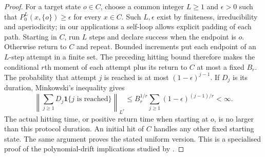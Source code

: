 \documentclass[12pt,a4paper]{article}
\theoremstyle{definition}
\theoremstyle{remark}\newtheorem{remark}{Remark}
\numberwithin{equation}{section}
\begin{document}
\begin{proof}
For a target state $o\in C$, choose a common integer $L\ge1$ and $\epsilon>0$ such that $P_0^L(x,\{o\})\ge\epsilon$ for every $x\in C$. Such $L,\epsilon$ exist by finiteness, irreducibility and aperiodicity; in our applications a self-loop allows explicit padding of each path. Starting in $C$, run $L$ steps and declare success when the endpoint is $o$. Otherwise return to $C$ and repeat. Bounded increments put each endpoint of an $L$-step attempt in a finite set. The preceding hitting bound therefore makes the conditional $r$th moment of each attempt plus its return to $C$ at most a fixed $B_r$. The probability that attempt $j$ is reached is at most $(1-\epsilon)^{j-1}$. If $D_j$ is its duration, Minkowski's inequality gives
\[
 \left\|\sum_{j\ge1}D_j\mathbf1\{j\text{ is reached}\}\right\|_{L^r}
 \le B_r^{1/r}\sum_{j\ge1}(1-\epsilon)^{(j-1)/r}<\infty.
\]
The actual hitting time, or positive return time when starting at $o$, is no larger than this protocol duration. An initial hit of $C$ handles any other fixed starting state. The same argument proves the stated uniform version. This is a specialised proof of the polynomial-drift implications studied by \citet{DoucEtAl2004,JarnerRoberts2002}.
\end{proof}
\end{document}
